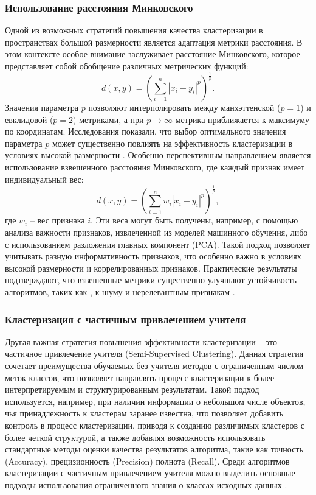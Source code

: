     \subsubsection{Использование расстояния Минковского}
        Одной из возможных стратегий повышения качества кластеризации в пространствах большой размерности является адаптация метрики расстояния. В этом контексте особое внимание заслуживает расстояние Минковского, которое представляет собой обобщение различных метрических функций:
        \begin{equation}
            \label{eq:minkowski}
            d(x, y) = \left( \sum_{i=1}^{n} |x_i - y_i|^p \right)^\frac{1}{p}.
        \end{equation}
        Значения параметра \(p\) позволяют интерполировать между манхэттенской (\(p=1\)) и евклидовой (\(p=2\)) метриками, а при \(p \to \infty\) метрика приближается к максимуму по координатам. Исследования показали, что выбор оптимального значения параметра \(p\) может существенно повлиять на эффективность кластеризации в условиях высокой размерности \cite{aggarwal2001surprising}. Особенно перспективным направлением является использование взвешенного расстояния Минковского, где каждый признак имеет индивидуальный вес:
        \begin{equation}
            \label{eq:weighted_minkowski}
            d(x, y) = \left( \sum_{i=1}^{n} w_i |x_i - y_i|^p \right)^\frac{1}{p},
        \end{equation}
        где \(w_i\) -- вес признака \(i\). Эти веса могут быть получены, например, с помощью анализа важности признаков, извлеченной из моделей машинного обучения, либо с использованием разложения главных компонент (PCA). Такой подход позволяет учитывать разную информативность признаков, что особенно важно в условиях высокой размерности и коррелированных признаков. Практические результаты подтверждают, что взвешенные метрики существенно улучшают устойчивость алгоритмов, таких как \kmeans{}, к шуму и нерелевантным признакам \cite{chouikhi2015featureweighting}.

    \subsubsection{Кластеризация с частичным привлечением учителя}
        Другая важная стратегия повышения эффективности кластеризации -- это частичное привлечение учителя (Semi-Supervised Clustering). Данная стратегия сочетает преимущества обучаемых без учителя методов с ограниченным числом меток классов, что позволяет направлять процесс кластеризации к более интерпретируемым и структурированным результатам. Такой подход используется, например, при наличии  информации о небольшом числе объектов, чья принадлежность к кластерам заранее известна, что позволяет добавить контроль в процесс кластеризации, приводя к созданию различимых кластеров с более четкой структурой, а также добавляя возможность использовать стандартные методы оценки качества результатов алгоритма, такие как точность (Accuracy), прецизионность (Precision) полнота (Recall). Среди алгоритмов кластеризации с частичным привлечением учителя можно выделить основные подходы использования ограниченного знания о классах исходных данных \cite{hse:5_course}.

